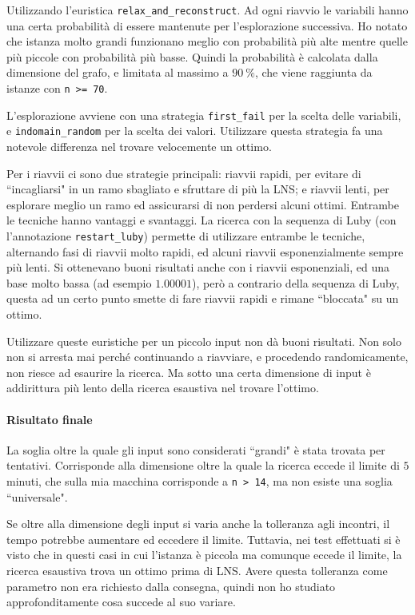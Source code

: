 \documentclass[11pt, a4paper]{article}
\begin{document}
Utilizzando l'euristica \lstinline{relax_and_reconstruct}. Ad ogni riavvio le variabili hanno una certa probabilità di essere mantenute per l'esplorazione successiva.
Ho notato che istanza molto grandi funzionano meglio con probabilità più alte mentre quelle più piccole con probabilità più basse. Quindi la probabilità è calcolata dalla dimensione del grafo, e limitata al massimo a $\qty{90}{\percent}$, che viene raggiunta da istanze con \lstinline{n >= 70}.

L'esplorazione avviene con una strategia \lstinline{first_fail} per la scelta delle variabili, e \lstinline{indomain_random} per la scelta dei valori.
Utilizzare questa strategia fa una notevole differenza nel trovare velocemente un ottimo.

Per i riavvii ci sono due strategie principali: riavvii rapidi, per evitare di ``incagliarsi" in un ramo sbagliato e sfruttare di più la LNS; e riavvii lenti, per esplorare meglio un ramo ed assicurarsi di non perdersi alcuni ottimi. Entrambe le tecniche hanno vantaggi e svantaggi.
La ricerca con la sequenza di Luby (con l'annotazione \lstinline{restart_luby}) permette di utilizzare entrambe le tecniche, alternando fasi di riavvii molto rapidi, ed alcuni riavvii esponenzialmente sempre più lenti.
Si ottenevano buoni risultati anche con i riavvii esponenziali, ed una base molto bassa (ad esempio $1.00001$), però a contrario della sequenza di Luby, questa ad un certo punto smette di fare riavvii rapidi e rimane ``bloccata" su un ottimo.

Utilizzare queste euristiche per un piccolo input non dà buoni risultati. Non solo non si arresta mai perché continuando a riavviare, e procedendo randomicamente, non riesce ad esaurire la ricerca.
Ma sotto una certa dimensione di input è addirittura più lento della ricerca esaustiva nel trovare l'ottimo.

\paragraph{Risultato finale}
La soglia oltre la quale gli input sono considerati ``grandi" è stata trovata per tentativi. Corrisponde alla dimensione oltre la quale la ricerca eccede il limite di $5$ minuti, che sulla mia macchina corrisponde a \lstinline{n > 14}, ma non esiste una soglia ``universale".

Se oltre alla dimensione degli input si varia anche la tolleranza agli incontri, il tempo potrebbe aumentare ed eccedere il limite. Tuttavia, nei test effettuati si è visto che in questi casi in cui l'istanza è piccola ma comunque eccede il limite, la ricerca esaustiva trova un ottimo prima di LNS.
Avere questa tolleranza come parametro non era richiesto dalla consegna, quindi non ho studiato approfonditamente cosa succede al suo variare.
\end{document}
